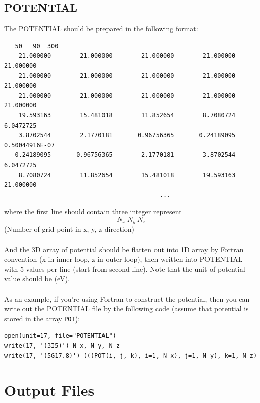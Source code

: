 \documentclass[10pt]{article}
\begin{document}
\subsection{POTENTIAL}
The POTENTIAL should be prepared in the following format:
{\footnotesize
\begin{lstlisting}
   50   90  300
    21.000000        21.000000        21.000000        21.000000        21.000000    
    21.000000        21.000000        21.000000        21.000000        21.000000    
    21.000000        21.000000        21.000000        21.000000        21.000000    
    19.593163        15.481018        11.852654        8.7080724        6.0472725    
    3.8702544        2.1770181       0.96756365       0.24189095       0.50044916E-07
   0.24189095       0.96756365        2.1770181        3.8702544        6.0472725    
    8.7080724        11.852654        15.481018        19.593163        21.000000 
                                           ...
\end{lstlisting}
}
\noindent
where the first line should contain three integer represent
\[N_x\ N_y\ N_z\]
(Number of grid-point in x, y, z direction)\\\\
And the 3D array of potential should be flatten out into 1D array by Fortran convention (x in inner loop, z in outer loop), then written into POTENTIAL with 5 values per-line (start from second line). Note that the unit of potential value should be (eV).\\\\
As an example, if you're using Fortran to construct the potential, then you can write out the POTENTIAL file by the following code (assume that potential is stored in the array \texttt{POT}):
\begin{lstlisting}
open(unit=17, file="POTENTIAL")
write(17, '(3I5)') N_x, N_y, N_z
write(17, '(5G17.8)') (((POT(i, j, k), i=1, N_x), j=1, N_y), k=1, N_z)
\end{lstlisting}

\section{Output Files}
\end{document}
